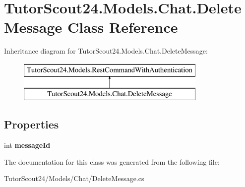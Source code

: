 \hypertarget{class_tutor_scout24_1_1_models_1_1_chat_1_1_delete_message}{}\section{Tutor\+Scout24.\+Models.\+Chat.\+Delete\+Message Class Reference}
\label{class_tutor_scout24_1_1_models_1_1_chat_1_1_delete_message}
Inheritance diagram for Tutor\+Scout24.\+Models.\+Chat.\+Delete\+Message\+:\begin{figure}[H]
\begin{center}
\leavevmode
\includegraphics[height=2.000000cm]{class_tutor_scout24_1_1_models_1_1_chat_1_1_delete_message}
\end{center}
\end{figure}
\subsection*{Properties}
\begin{DoxyCompactItemize}
\item 
\mbox{\label{class_tutor_scout24_1_1_models_1_1_chat_1_1_delete_message_a3c00d094706a14d6ee17a796feb09069}} 
int {\bfseries message\+Id}
\end{DoxyCompactItemize}


The documentation for this class was generated from the following file\+:\begin{DoxyCompactItemize}
\item 
Tutor\+Scout24/\+Models/\+Chat/Delete\+Message.\+cs\end{DoxyCompactItemize}
